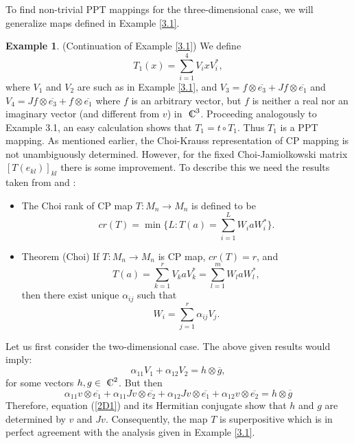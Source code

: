 \documentclass{amsart}
\theoremstyle{plain}
\theoremstyle{definition}
\newtheorem{exmp}[thm]{Example}
\newcommand{\Cn}{{\setbox0=\hbox{
$\displaystyle\rm C$}\hbox{\hbox
to0pt{\kern0.6\wd0\vrule height0.9\ht0\hss}\box0}}} %
\begin{document}
To find non-trivial PPT mappings for the three-dimensional case,  we will generalize maps defined in Example \ref{3.1}.
\begin{exmp} (Continuation of Example \ref{3.1})
We define
\begin{equation}
T_1(x) = \sum_{i=1}^4 V_i x V_i^*,
\end{equation}
where $V_1$ and $V_2$ are such as in Example \ref{3.1}, and $V_3 = f \otimes \overline{e_3} + Jf \otimes \overline{e_1}$ and
$V_4= Jf \otimes \overline{e_3} + f \otimes \overline{e_1}$ where $f$ is an arbitrary vector, but $f$ is neither a real nor an imaginary vector (and different from $v$)
in $\Cn^3$.
Proceeding analogously to Example 3.1, an easy calculation shows that $T_1 = t \circ T_1$. Thus $T_1$ is a PPT mapping. As mentioned earlier, the Choi-Krauss representation of CP mapping is not unambiguously determined. However, for the fixed Choi-Jamiolkowski matrix $[T(e_{kl})]_{kl}$ there is some improvement. To describe this we need the results taken from \cite{Choi} and \cite{Paulsen}:
\begin{itemize}
\item The Choi rank of CP map $T: M_n \to M_n$ is defined to be
\begin{equation}
cr(T) = \min \{ L: T(a) = \sum_{i=1}^L W_iaW^*_i \}.
\end{equation}
\item Theorem (Choi) If $T: M_n  \to M_n$ is CP map, $cr(T) = r$, and 
\begin{equation}
T(a) = \sum_{k=1}^r V_k a V^*_k = \sum_{l=1}^m W_l aW^*_l,
\end{equation}
then there exist unique $\alpha_{ij}$ such that
$$W_i = \sum_{j=1}^r \alpha_{ij}V_j.$$
\end{itemize}
Let us first consider the two-dimensional case. The above given results would imply:
\begin{equation}
\alpha_{11}V_1 + \alpha_{12}V_2 = h \otimes \overline{g},
\end{equation}
for some vectors $h,g \in\Cn^2$. But then
\begin{equation}
\label{2D1}
\alpha_{11} v \otimes \overline{e_1} + \alpha_{11} J v \otimes \overline{e_2} + \alpha_{12} Jv\otimes \overline{e_1} +\alpha_{12} v \otimes \overline{e_2} = h \otimes \overline{g}
\end{equation}
Therefore, equation (\ref{2D1})  and its Hermitian conjugate show that $h$ and $g$ are determined by $v$ and $Jv$. Consequently, the map $T$ is superpositive which is in perfect agreement with the analysis given in Example \ref{3.1}.


\end{exmp}
\end{document}
